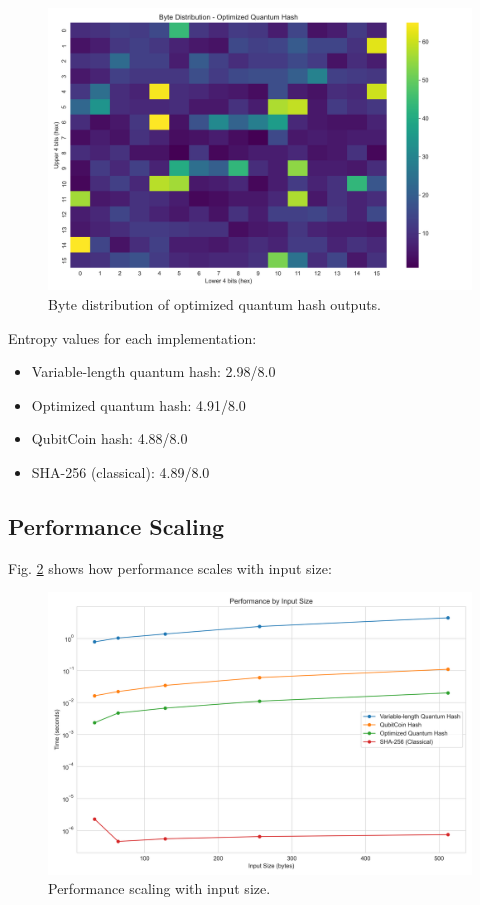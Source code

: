 \documentclass[conference]{IEEEtran}
\begin{document}
\begin{figure}[!ht]
\centering
\includegraphics[width=\columnwidth]{visualizations/byte_distribution_Optimized_Quantum_Hash.png}
\caption{Byte distribution of optimized quantum hash outputs.}
\label{fig:byte_distribution}
\end{figure}

Entropy values for each implementation:
\begin{itemize}
    \item Variable-length quantum hash: 2.98/8.0
    \item Optimized quantum hash: 4.91/8.0
    \item QubitCoin hash: 4.88/8.0
    \item SHA-256 (classical): 4.89/8.0
\end{itemize}

\subsection{Performance Scaling}
Fig. \ref{fig:performance_by_size} shows how performance scales with input size:

\begin{figure}[!ht]
\centering
\includegraphics[width=\columnwidth]{visualizations/performance_by_size.png}
\caption{Performance scaling with input size.}
\label{fig:performance_by_size}
\end{figure}
\end{document}
